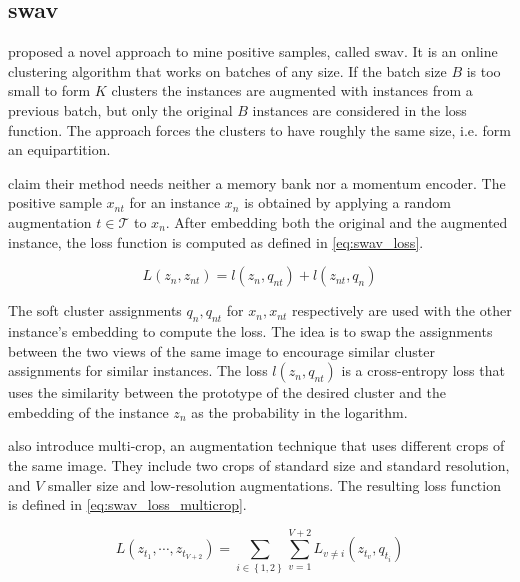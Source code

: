 \subsection{\acl{swav}}\label{subsec:SwAV}

\citet{swav_2020} proposed a novel approach to mine positive samples, called \ac{swav}.
It is an online clustering algorithm that works on batches of any size.
If the batch size $B$ is too small to form $K$ clusters the instances are augmented 
with instances from a previous batch, 
but only the original $B$ instances are considered in the loss function.
The approach forces the clusters to have roughly the same size, i.e. form an equipartition.

\citeauthor{swav_2020} claim their method needs neither a memory bank nor a momentum encoder.
The positive sample $x_{nt}$ for an instance $x_n$ is obtained by applying a 
random augmentation $t \in \mathcal{T}$ to $x_n$.
After embedding both the original and the augmented instance, the loss function is computed 
as defined in \eqref{eq:swav_loss}.

\begin{equation}
    L(z_n, z_{nt}) = l(z_n, q_{nt}) + l(z_{nt}, q_n)
    \label{eq:swav_loss}
\end{equation}

The soft cluster assignments $q_n, q_{nt}$ for $x_n, x_{nt}$ respectively 
are used with the other instance's embedding to compute the loss.
The idea is to swap the assignments between the two views of the same image to encourage 
similar cluster assignments for similar instances.
The loss $l(z_n, q_{nt})$ is a cross-entropy loss that uses the similarity between the prototype 
of the desired cluster and the embedding of the instance $z_n$ as the probability in the logarithm.

\citeauthor{swav_2020} also introduce multi-crop, an augmentation technique that uses different 
crops of the same image.
They include two crops of standard size and standard resolution, 
and $V$ smaller size and low-resolution augmentations.
The resulting loss function is defined in \eqref{eq:swav_loss_multicrop}.

\begin{equation}
    L(z_{t_{1}}, \cdots , z_{t_{V+2}})= \sum_{i\in \left\{ 1,2 \right\} }^{}\sum_{v=1}^{V+2} L_{v \neq i}(z_{t_{v}}, q_{t_{i}})
    \label{eq:swav_loss_multicrop}
\end{equation}